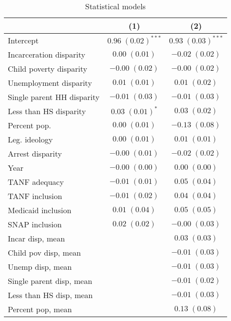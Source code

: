 
\begin{table}
\caption{Statistical models}
\begin{center}
\begin{tabular}{l c c }
\hline
 & (1) & (2) \\
\hline
Intercept                  & $0.96 \; (0.02)^{***}$ & $0.93 \; (0.03)^{***}$ \\
Incarceration disparity    & $0.00 \; (0.01)$       & $-0.02 \; (0.02)$      \\
Child poverty disparity    & $-0.00 \; (0.02)$      & $-0.00 \; (0.02)$      \\
Unemployment disparity     & $0.01 \; (0.01)$       & $0.01 \; (0.02)$       \\
Single parent HH disparity & $-0.01 \; (0.03)$      & $-0.01 \; (0.03)$      \\
Less than HS disparity     & $0.03 \; (0.01)^{*}$   & $0.03 \; (0.02)$       \\
Percent pop.               & $0.00 \; (0.01)$       & $-0.13 \; (0.08)$      \\
Leg. ideology              & $0.00 \; (0.01)$       & $0.01 \; (0.01)$       \\
Arrest disparity           & $-0.00 \; (0.01)$      & $-0.02 \; (0.02)$      \\
Year                       & $-0.00 \; (0.00)$      & $0.00 \; (0.00)$       \\
TANF adequacy              & $-0.01 \; (0.01)$      & $0.05 \; (0.04)$       \\
TANF inclusion             & $-0.01 \; (0.02)$      & $0.04 \; (0.04)$       \\
Medicaid inclusion         & $0.01 \; (0.04)$       & $0.05 \; (0.05)$       \\
SNAP inclusion             & $0.02 \; (0.02)$       & $-0.00 \; (0.03)$      \\
Incar disp, mean           &                        & $0.03 \; (0.03)$       \\
Child pov disp, mean       &                        & $-0.01 \; (0.03)$      \\
Unemp disp, mean           &                        & $-0.01 \; (0.03)$      \\
Single parent disp, mean   &                        & $-0.01 \; (0.02)$      \\
Less than HS disp, mean    &                        & $-0.01 \; (0.03)$      \\
Percent pop, mean          &                        & $0.13 \; (0.08)$       \\

\end{tabular}
\end{center}
\end{table}
